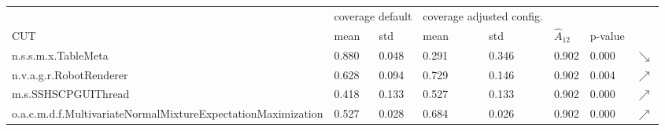 \begin{tabular}{l|ll|ll|lll}
\hline
                                                             & \multicolumn{2}{l|}{coverage default} & \multicolumn{2}{l|}{coverage adjusted config.} &                &         &           \\
CUT                                                          & mean               & std               & mean              & std               & $\hat{A}_{12}$ & p-value &           \\ \hline
n.s.s.m.x.TableMeta                                          & 0.880              & 0.048             & 0.291             & 0.346             & 0.902          & 0.000   & $\searrow$ \\
n.v.a.g.r.RobotRenderer                                      & 0.628              & 0.094             & 0.729             & 0.146             & 0.902          & 0.004   & $\nearrow$ \\
m.s.SSHSCPGUIThread                                          & 0.418              & 0.133             & 0.527             & 0.133             & 0.902          & 0.000   & $\nearrow$ \\
o.a.c.m.d.f.MultivariateNormalMixtureExpectationMaximization & 0.527              & 0.028             & 0.684             & 0.026             & 0.902          & 0.000   & $\nearrow$ \\ 
\end{tabular}
